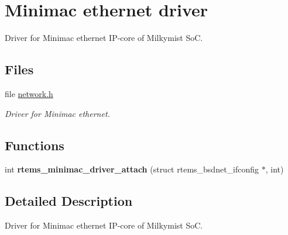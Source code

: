 \hypertarget{group__lm32__milkymist__network}{}\section{Minimac ethernet driver}
\label{group__lm32__milkymist__network}


Driver for Minimac ethernet I\+P-\/core of Milkymist SoC.  


\subsection*{Files}
\begin{DoxyCompactItemize}
\item 
file \mbox{\hyperlink{network_8h}{network.\+h}}
\begin{DoxyCompactList}\small\item\em Driver for Minimac ethernet. \end{DoxyCompactList}\end{DoxyCompactItemize}
\subsection*{Functions}
\begin{DoxyCompactItemize}
\item 
\mbox{\label{group__lm32__milkymist__network_gab5c0b222f90590b84302778b080bb99f}} 
int {\bfseries rtems\+\_\+minimac\+\_\+driver\+\_\+attach} (struct rtems\+\_\+bsdnet\+\_\+ifconfig $\ast$, int)
\end{DoxyCompactItemize}


\subsection{Detailed Description}
Driver for Minimac ethernet I\+P-\/core of Milkymist SoC. 


